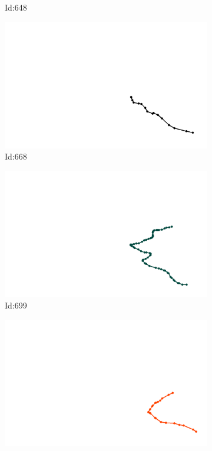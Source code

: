 \documentclass[12pt,twoside]{report}
\begin{document}
\begin{figure}
\begin{subfigure}[b]{0.20\textwidth}
\caption{Id:648}
\end{subfigure}
\begin{subfigure}[b]{0.20\textwidth}
\centering
\includegraphics[width=\textwidth]{../trajectories/668.png}
\caption{Id:668}
\end{subfigure}
\begin{subfigure}[b]{0.20\textwidth}
\centering
\includegraphics[width=\textwidth]{../trajectories/699.png}
\caption{Id:699}
\end{subfigure}
\begin{subfigure}[b]{0.20\textwidth}
\centering
\includegraphics[width=\textwidth]{../trajectories/716.png}

\end{subfigure}
\end{figure}
\end{document}
